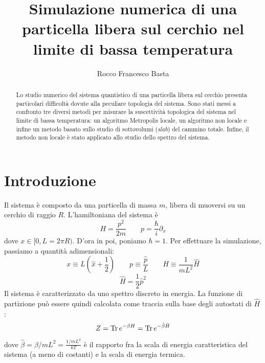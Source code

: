 \documentclass[a4paper,11pt]{article}
\title{Simulazione numerica di una particella libera sul cerchio nel limite di bassa temperatura}
\author{Rocco Francesco Basta}
\date{}
\begin{document}
\maketitle

\begin{abstract}
    Lo studio numerico del sistema quantistico di una particella libera sul cerchio presenta particolari difficoltà dovute alla peculiare topologia del sistema. Sono stati messi a confronto tre diversi metodi per misurare la suscettività topologica del sistema nel limite di bassa temperatura: un algoritmo Metropolis locale, un algoritmo non locale e infine un metodo basato sullo studio di sottovolumi (\emph{slab}) del cammino totale. Infine, il metodo non locale è stato applicato allo studio dello spettro del sistema. 
\end{abstract}

\section{Introduzione}

    Il sistema è composto da una particella di massa $m$, libera di muoversi su un cerchio di raggio $R$. L'hamiltoniana del sistema è
    \begin{equation}
        H = \frac{p^2}{2m} \quad \quad p = \frac{\hbar}{i} \partial_x
    \end{equation}
    dove $x \in [0, L = 2\pi R)$. D'ora in poi, poniamo $\hbar = 1$.
    Per effettuare la simulazione, passiamo a quantità adimensionali:
    \begin{equation}
        x \equiv L\left(\hat{x} + \frac{1}{ 2} \right) \quad \quad
        p \equiv \frac{\hat{p}}{L} \quad \quad 
        H \equiv \frac{1}{mL^2} \hat{H}
    \end{equation}
    \begin{equation}
        \hat{H} = \frac{1}{2} \hat{p}^2
    \end{equation}
    Il sistema è caratterizzato da uno spettro discreto in energia. La funzione di partizione può essere quindi calcolata come traccia sulla base degli autostati di $\hat{H}$:
    \begin{equation}
        Z = \Tr e^{-\beta H} = \Tr e^{-\hat{\beta} \hat{H}}
    \end{equation}
    dove $\hat{\beta} = \beta / mL^2 = \frac{1/mL^2}{kT}$ è il rapporto fra la scala di energia caratteristica del sistema (a meno di costanti) e la scala di energia termica.
    
\end{document}
